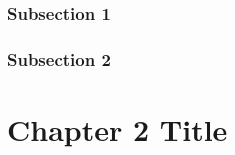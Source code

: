 \documentclass{tufte-book} %
\begin{document}
\subsection{Subsection 1}

\lipsum[9-10]

\subsection{Subsection 2}

\lipsum[11-12]


\chapter{Chapter 2 Title}
\label{ch:2}

\lipsum[13-20]


\backmatter




\printindex %
\end{document}

